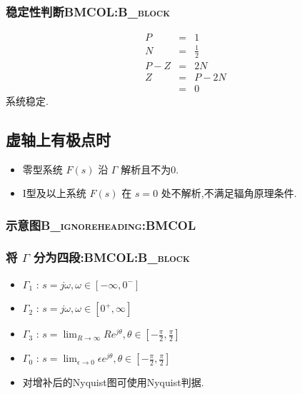 \documentclass[table]{beamer}
\begin{document}
\subsubsection[稳定性判断]{稳定性判断\hfill{}\textsc{BMCOL:B\_block}}
\label{sec:orgcaf72e2}
\begin{eqnarray*}
P & = & 1\\
N &=& \frac{1}{2} \\
P-Z &=& 2N \\
Z &=& P-2N \\
  &=&0 
\end{eqnarray*}
系统稳定.

\subsection{虚轴上有极点时}
\label{sec:org91d5ddd}
\begin{itemize}
\item 零型系统 \(F(s)\) 沿 \(\Gamma\) 解析且不为0.
\item I型及以上系统 \(F(s)\) 在 \(s=0\) 处不解析,不满足辐角原理条件.
\end{itemize}

\subsubsection[示意图]{示意图\hfill{}\textsc{B\_ignoreheading:BMCOL}}
\label{sec:org0ba107e}

\subsubsection[将 \(\Gamma\) 分为四段:]{将 \(\Gamma\) 分为四段:\hfill{}\textsc{BMCOL:B\_block}}
\label{sec:org823a2e7}
\begin{itemize}
\item \(\Gamma_1\) : \(s=j\omega,\omega\in[-\infty,0^-]\)
\item \(\Gamma_2\) : \(s=j\omega,\omega\in[0^+,\infty]\)
\item \(\Gamma_3\) : \(s=\lim_{R\rightarrow\infty}Re^{j\theta},\theta\in[-\frac{\pi}{2},\frac{\pi}{2}]\)
\item \(\Gamma_0\) : \(s=\lim_{\epsilon\rightarrow 0}\epsilon e^{j\theta},\theta\in[-\frac{\pi}{2},\frac{\pi}{2}]\)
\item <3->对增补后的Nyquist图可使用Nyquist判据.
\end{itemize}
\end{document}
